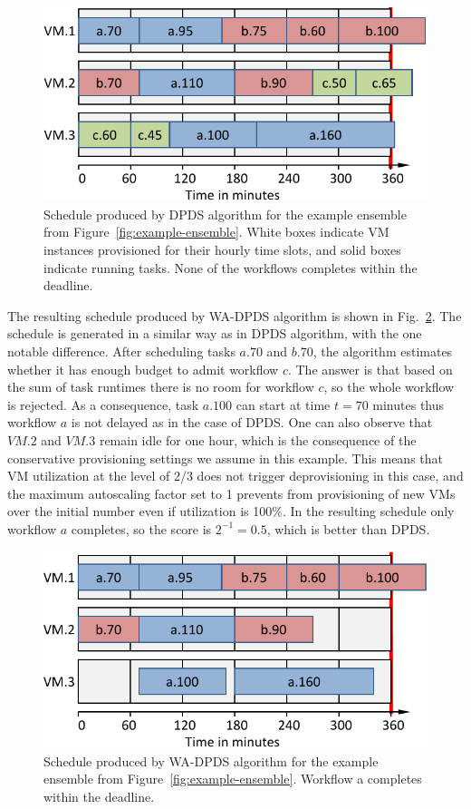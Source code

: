 \documentclass[preprint,5p]{elsarticle}
\begin{document}
\begin{figure}[htb] 
  \centering
  \includegraphics[width=0.80\columnwidth]{figures/algorithms-example-dpds}
  \caption{Schedule produced by DPDS algorithm for the example ensemble from Figure~\ref{fig:example-ensemble}.
  White boxes indicate VM instances provisioned for their hourly time slots, 
  and solid boxes indicate running tasks.
  None of the workflows completes within the deadline.}
  \label{fig:algorithms-example-dpds}
\end{figure}


The resulting schedule produced by WA-DPDS algorithm is shown in Fig.~\ref{fig:algorithms-example-wadpds}.
The schedule is generated in a similar way as in DPDS algorithm, with the one notable difference. 
After scheduling tasks $a.70$ and $b.70$, the algorithm estimates whether it has enough budget to 
admit workflow $c$. The answer is that based on the sum of task runtimes there is no room for workflow $c$,
so the whole workflow is rejected. As a consequence, task $a.100$ can start at time $t=70$ minutes
thus workflow $a$ is not delayed as in the case of DPDS. One can also observe that $VM.2$ and $VM.3$ remain idle for
one hour, which is the consequence of the conservative provisioning settings we assume in this example.  
This means that VM utilization at the level of 2/3 does not trigger deprovisioning in this case, and the maximum autoscaling
factor set to 1 prevents from provisioning of new VMs over the initial number even if utilization is 100\%.
In the resulting schedule only workflow $a$ completes, so the score is $2^{-1} = 0.5$, which is better than DPDS.

\begin{figure}[htb] 
  \centering
  \includegraphics[width=0.80\columnwidth]{figures/algorithms-example-wadpds}
  \caption{Schedule produced by WA-DPDS algorithm for the example ensemble from Figure~\ref{fig:example-ensemble}.
  Workflow a completes within the deadline.}
  \label{fig:algorithms-example-wadpds}
\end{figure}
\end{document}
